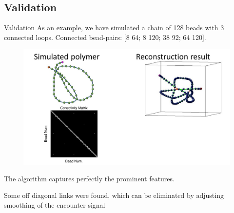 \documentclass[8pt]{beamer}
\begin{document}
\subsection{Validation}
\begin{frame}{Validation}
As an example, we have simulated a  chain of 128 beads with 3 connected loops. Connected bead-pairs: [8 64; 8 120; 38 92; 64 120]. 
\begin{figure}
\includegraphics[scale=0.25]{reconstructionResultCompositeStructure}
\end{figure}
The algorithm captures perfectly the prominent features. 

Some off diagonal links were found, which can be eliminated by adjusting smoothing of the encounter signal 

\end{frame}
\end{document}
